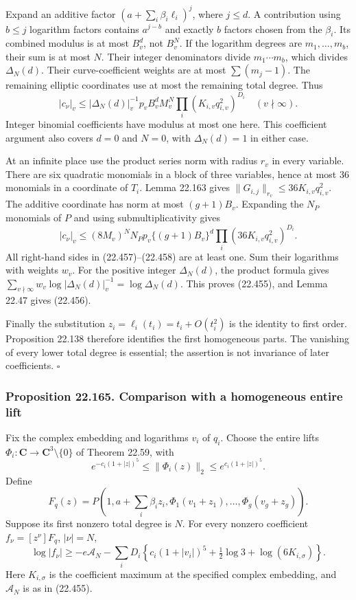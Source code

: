 \documentclass[
  11pt,
  a4paper,
]{article}
\begin{document}
Expand an additive factor \((a+\sum_i\beta_i\ell_i)^j\), where
\(j\le d\). A contribution using \(b\le j\) logarithm factors contains
\(a^{j-b}\) and exactly \(b\) factors chosen from the \(\beta_i\). Its
combined modulus is at most \(B_v^d\), not \(B_v^N\). If the logarithm
degrees are \(m_1,\ldots,m_b\), their sum is at most \(N\). Their
integer denominators divide \(m_1\cdots m_b\), which divides
\(\Delta_N(d)\). Their curve-coefficient weights are at most
\(\sum(m_j-1)\). The remaining elliptic coordinates use at most the
remaining total degree. Thus \[
 |c_\nu|_v\le
 |\Delta_N(d)|_v^{-1}p_vB_v^dM_v^N
               \prod_i(K_{i,v}q_{i,v}^2)^{D_i}
 \quad(v\nmid\infty).
 \tag{22.457}
\] Integer binomial coefficients have modulus at most one here. This
coefficient argument also covers \(d=0\) and \(N=0\), with
\(\Delta_N(d)=1\) in either case.

At an infinite place use the product series norm with radius \(r_v\) in
every variable. There are six quadratic monomials in a block of three
variables, hence at most 36 monomials in a coordinate of \(T_i\). Lemma
22.163 gives \(\|G_{i,j}\|_{r_v}\le36K_{i,v}q_{i,v}^2\). The additive
coordinate has norm at most \((g+1)B_v\). Expanding the \(N_P\)
monomials of \(P\) and using submultiplicativity gives \[
 |c_\nu|_v\le
 (8M_v)^N N_Pp_v\{(g+1)B_v\}^d
               \prod_i(36K_{i,v}q_{i,v}^2)^{D_i}.
 \tag{22.458}
\] All right-hand sides in (22.457)--(22.458) are at least one. Sum
their logarithms with weights \(w_v\). For the positive integer
\(\Delta_N(d)\), the product formula gives
\(\sum_{v\nmid\infty}w_v\log|\Delta_N(d)|_v^{-1}
=\log\Delta_N(d)\). This proves (22.455), and Lemma 22.47 gives
(22.456).

Finally the substitution \(z_i=\ell_i(t_i)=t_i+O(t_i^2)\) is the
identity to first order. Proposition 22.138 therefore identifies the
first homogeneous parts. The vanishing of every lower total degree is
essential; the assertion is not invariance of later coefficients.
\(\square\)

\subsubsection{Proposition 22.165. Comparison with a homogeneous entire
lift}\label{proposition-22.165.-comparison-with-a-homogeneous-entire-lift}

Fix the complex embedding and logarithms \(v_i\) of \(q_i\). Choose the
entire lifts \(\Phi_i:\mathbf C\to
\mathbf C^3\setminus\{0\}\) of Theorem 22.59, with \[
 e^{-c_i(1+|z|)^5}\le\|\Phi_i(z)\|_2
                       \le e^{c_i(1+|z|)^5}.
 \tag{22.459}
\] Define \[
 F_q(z)=P\left(1,a+\sum_i\beta_i z_i,
                  \Phi_1(v_1+z_1),\ldots,\Phi_g(v_g+z_g)\right).
 \tag{22.460}
\] Suppose its first nonzero total degree is \(N\). For every nonzero
coefficient \(f_\nu=[z^\nu]F_q\), \(|\nu|=N\), \[
 \log|f_\nu|\ge-e\mathcal A_N
 -\sum_iD_i\left\{c_i(1+|v_i|)^5
                  +\tfrac12\log3+\log(6K_{i,\sigma})\right\}.
 \tag{22.461}
\] Here \(K_{i,\sigma}\) is the coefficient maximum at the specified
complex embedding, and \(\mathcal A_N\) is as in (22.455).
\end{document}
